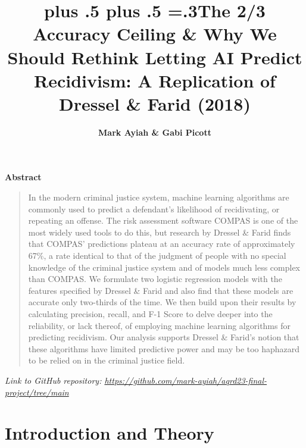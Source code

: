 \documentclass[12pt, ]{article}
\title{\sffamily\bfseries\huge\parfillskip=0pt
\rightskip=0pt plus .5\textwidth
\leftskip=0pt plus .5\textwidth
\emergencystretch=.3\textwidth The 2/3 Accuracy Ceiling \& Why We Should
Rethink Letting AI Predict Recidivism: A Replication of Dressel \& Farid
(2018)}
\author{\textbf{Mark Ayiah \& Gabi Picott}
 }
\date{}
\renewenvironment{abstract}{
  \centerline
  {\large\sffamily\bfseries Abstract}\vspace{-1em}
  \begin{quote}\small
}{
  \end{quote}
}
\begin{document}
\allsectionsfont{\sffamily}

\maketitle

\begin{abstract}
In the modern criminal justice system, machine learning algorithms are
commonly used to predict a defendant's likelihood of recidivating, or
repeating an offense. The risk assessment software COMPAS is one of the
most widely used tools to do this, but research by Dressel \& Farid
finds that COMPAS' predictions plateau at an accuracy rate of
approximately 67\%, a rate identical to that of the judgment of people
with no special knowledge of the criminal justice system and of models
much less complex than COMPAS. We formulate two logistic regression
models with the features specified by Dressel \& Farid and also find
that these models are accurate only two-thirds of the time. We then
build upon their results by calculating precision, recall, and F-1 Score
to delve deeper into the reliability, or lack thereof, of employing
machine learning algorithms for predicting recidivism. Our analysis
supports Dressel \& Farid's notion that these algorithms have limited
predictive power and may be too haphazard to be relied on in the
criminal justice field.
\end{abstract}

\ifdefined\Shaded\renewenvironment{Shaded}{\begin{tcolorbox}[enhanced, sharp corners, interior hidden, boxrule=0pt, frame hidden, borderline west={3pt}{0pt}{shadecolor}, breakable]}{\end{tcolorbox}}\fi




\emph{Link to GitHub repository:
\url{https://github.com/mark-ayiah/aqrd23-final-project/tree/main}}

\hypertarget{introduction-and-theory}{%
\section{Introduction and Theory}\label{introduction-and-theory}}
\end{document}
